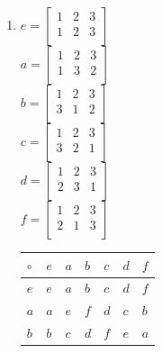 \documentclass{article}
\begin{document}
\begin{enumerate}
    \item \begin{minipage}{0.5\textwidth}
        \centering
        $e = \begin{bmatrix}
            1 & 2 & 3 \\
            1 & 2 & 3 \\
        \end{bmatrix}$\\
        $a = \begin{bmatrix}
            1 & 2 & 3 \\
            1 & 3 & 2 \\
        \end{bmatrix}$\\
        $b = \begin{bmatrix}
            1 & 2 & 3 \\
            3 & 1 & 2 \\
        \end{bmatrix}$\\
        $c = \begin{bmatrix}
            1 & 2 & 3 \\
            3 & 2 & 1 \\
        \end{bmatrix}$\\
        $d = \begin{bmatrix}
            1 & 2 & 3 \\
            2 & 3 & 1 \\
        \end{bmatrix}$\\
        $f = \begin{bmatrix}
            1 & 2 & 3 \\
            2 & 1 & 3 \\
        \end{bmatrix}$\\
    \end{minipage}
    \begin{minipage}{0.5\textwidth}
        \centering
        \begin{tabular}{l|llllll}
            $\circ$ & $e$ & $a$ & $b$ & $c$ & $d$ & $f$ \\ \hline
            $e$       & $e$ & $a$ & $b$ & $c$ & $d$ & $f$ \\
            $a$       & $a$ & $e$ & $f$ & $d$ & $c$ & $b$ \\
            $b$       & $b$ & $c$ & $d$ & $f$ & $e$ & $a$ \\

\end{tabular}
\end{minipage}
\end{enumerate}
\end{document}

